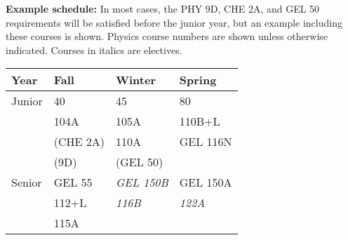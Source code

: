 \documentclass[12pt]{article}
\begin{document}
\noindent
{\bf Example schedule:} In most cases, the PHY 9D, CHE 2A, and GEL 50
requirements will be satisfied before the junior year, but an example
including these courses is shown.  Physics course numbers are shown
unless otherwise indicated.  Courses in italics are electives.\\
\vskip 0.25cm
\begin{center}
\begin{tabular}{|l|l|l|l|}
\hline
Year      & Fall    & Winter & Spring \\
\hline
Junior    & 40         & 45           & 80 \\
          & 104A       & 105A         & 110B+L \\
          & (CHE 2A)   & 110A         & GEL 116N \\
          & (9D)       & (GEL 50)     &  \\
\hline
Senior   & GEL 55      & {\it GEL 150B}     & GEL 150A \\
         & 112+L       & {\it 116B}         & {\it 122A}  \\
         & 115A        &              & \\
\hline
\end{tabular}
\newpage



\end{center}
\end{document}
